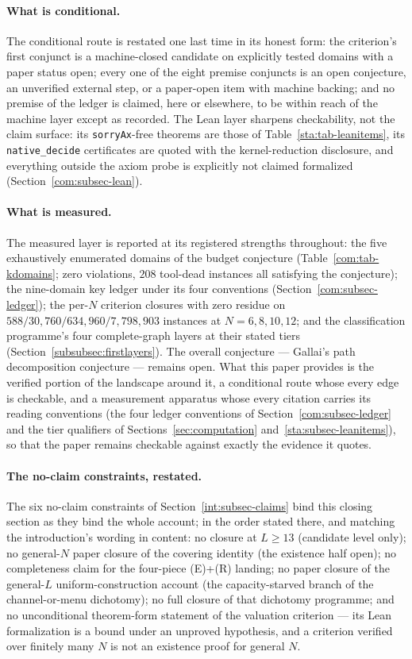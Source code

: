 \paragraph{What is conditional.} The conditional route is
restated one last time in its honest form: the criterion's first
conjunct is a machine-closed candidate on explicitly tested domains with
a paper status open; every one of the eight premise conjuncts is an open
conjecture, an unverified external step, or a paper-open item with
machine backing; and no premise of the ledger is claimed, here or
elsewhere, to be within reach of the machine layer except as recorded.
The Lean layer sharpens checkability, not the claim surface: its
\texttt{sorryAx}-free theorems are those of
Table~\ref{sta:tab-leanitems}, its \texttt{native\_decide} certificates
are quoted with the kernel-reduction disclosure, and everything outside
the axiom probe is explicitly not claimed formalized
(Section~\ref{com:subsec-lean}).

\paragraph{What is measured.} The measured layer is reported at its
registered strengths throughout: the five exhaustively enumerated domains
of the budget conjecture (Table~\ref{com:tab-kdomains}; zero violations,
$208$ tool-dead instances all satisfying the conjecture); the nine-domain
key ledger under its four conventions
(Section~\ref{com:subsec-ledger}); the per-$N$ criterion closures with
zero residue on $588/30{,}760/634{,}960/7{,}798{,}903$ instances at
$N=6,8,10,12$; and the classification programme's four complete-graph
layers at their stated tiers (Section~\ref{subsubsec:firstlayers}). The
overall conjecture --- Gallai's path decomposition conjecture --- remains
open. What this paper provides is the verified portion of the landscape
around it, a conditional route whose every edge is checkable, and a
measurement apparatus whose every citation carries its reading
conventions (the four ledger conventions of Section~\ref{com:subsec-ledger}
and the tier qualifiers of Sections~\ref{sec:computation}
and~\ref{sta:subsec-leanitems}), so that the paper remains checkable
against exactly the evidence it quotes.

\paragraph{The no-claim constraints, restated.} The six no-claim
constraints of Section~\ref{int:subsec-claims} bind this closing section
as they bind the whole account; in the order stated there, and matching
the introduction's wording in content: no
closure at $L\ge13$ (candidate level only); no general-$N$ paper closure
of the covering identity (the existence half open); no completeness
claim for the four-piece (E)+(R) landing; no paper closure of the
general-$L$ uniform-construction account (the capacity-starved branch of
the channel-or-menu dichotomy); no full closure of that dichotomy
programme; and no
unconditional theorem-form statement of the valuation criterion --- its
Lean formalization is a bound under an unproved hypothesis, and a
criterion verified over finitely many $N$ is not an existence proof for
general $N$.

